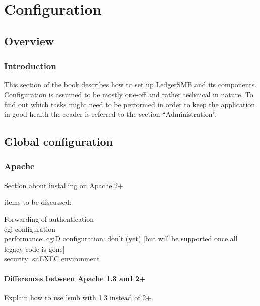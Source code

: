 

\part{Configuration}
\label{part-configuration}


\chapter{Overview}
\label{cha-configuration-overview}

\section{Introduction}
\label{sec-config-overview-introduction}
This section of the book describes how to set up LedgerSMB and its components.
Configuration is assumed to be mostly one-off and rather technical in nature.  To find
out which tasks might need to be performed in order to keep the application in good
health the reader is referred to the section ``Administration''. 

\chapter{Global configuration}
\label{cha-global-configuration}

\section{Apache}
\label{sec-global-config-apache}

Section about installing on Apache 2+

items to be discussed:

Forwarding of authentication \\
cgi configuration \\
performance: cgiD configuration: don't (yet) [but will be supported once all legacy code is gone] \\
security: suEXEC environment \\

\subsection{Differences between Apache 1.3 and 2+}
\label{subsec-global-config-apache-13-vs-2}

Explain how to use lsmb with 1.3 instead of 2+.

